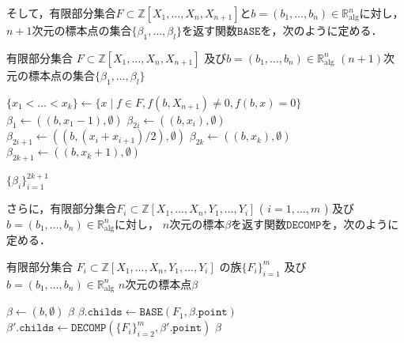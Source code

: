 \documentclass[uplatex, dvipdfmx]{jsarticle}
\numberwithin{equation}{section}
\newcommand{\Ralg}{\mathbb{R}_\mathrm{alg}}
\newcommand{\Z}{\mathbb{Z}}
\theoremstyle{definition}
\begin{document}
そして，有限部分集合$F \subset \Z[X_1, \dots, X_n, X_{n+1}]$と$b=(b_1, \dots, b_n) \in \Ralg^n$に対し，
$n+1$次元の標本点の集合$\{\beta_1, \dots, \beta_l\}$を返す関数$\mathtt{BASE}$を，次のように定める．
\begin{algorithm}[H]
     \caption {$\mathtt{BASE}(F, b)$}
     \begin{algorithmic}[1]
          \REQUIRE 
               有限部分集合
               $F \subset \Z[X_1, \dots, X_n, X_{n+1}]$
               及び$b = (b_1, \dots, b_n) \in \Ralg^n$
          \ENSURE 
               $(n+1)$次元の標本点の集合$\{\beta_1, \dots, \beta_l\}$

          \STATE $\{x_1 < \dots < x_k\} \leftarrow \{x \mid f \in F, f(b, X_{n+1}) \neq 0,  f(b, x) = 0\}$
          \STATE $\beta_1 \leftarrow ((b, x_1 - 1), \emptyset)$
               \STATE $\beta_{2i} \leftarrow ((b, x_i), \emptyset)$
               \STATE $\beta_{2i+1} \leftarrow ((b, (x_i+x_{i+1})/2), \emptyset)$
          \ENDFOR
          \STATE $\beta_{2k} \leftarrow ((b, x_k), \emptyset)$
          \STATE $\beta_{2k+1} \leftarrow ((b, x_k+1), \emptyset)$
     
          \RETURN $\{\beta_i\}_{i=1}^{2k+1}$
     \end{algorithmic}
\end{algorithm}

さらに，有限部分集合$F_i \subset \Z[X_1, \dots, X_n, Y_1, \dots, Y_i]$ ( $i=1, \dots, m$ ) 
及び$b=(b_1, \dots, b_n) \in \Ralg^n$に対し，
$n$次元の標本$\beta$を返す関数$\mathtt{DECOMP}$を，次のように定める．

\begin{algorithm}[H]
     \caption {$\mathtt{DECOMP}(\{F_i\}_{i=1}^m, b)$}
     \begin{algorithmic}[1]
          \REQUIRE 
               有限部分集合
               $F_i \subset \Z[X_1, \dots, X_n, Y_1, \dots, Y_i]$
               の族$\{F_i\}_{i=1}^m$ 
               及び$b=(b_1, \dots, b_n) \in \Ralg^n$
          \ENSURE 
               $n$次元の標本点$\beta$

          $\beta \leftarrow(b, \emptyset)$
               \RETURN $\beta$
          \ENDIF
               \STATE $\beta.\mathtt{childs} \leftarrow \mathtt{BASE}(F_1, \beta.\mathtt{point})$
                    \STATE $\beta'.\mathtt{childs} \leftarrow \mathtt{DECOMP}(\{F_i\}_{i=2}^m, \beta'.\mathtt{point})$
               \ENDFOR
          \RETURN $ \beta $
     \end{algorithmic}
\end{algorithm}
\end{document}
